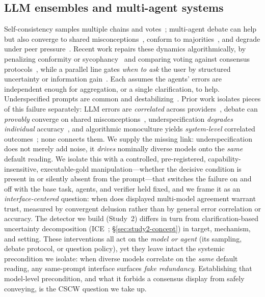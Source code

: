 \documentclass[acmsmall,screen,review,anonymous]{acmart}
\begin{document}
\subsection{LLM ensembles and multi-agent systems}
Self-consistency samples multiple chains and votes~\cite{wang2023selfconsistency}; multi-agent debate can
help~\cite{du2023debate,liang2024} but also converge to shared misconceptions~\cite{estornell2024}, conform
to majorities~\cite{choi2025conformity}, and degrade under peer pressure~\cite{wynn2025talk}. Recent work
repairs these dynamics algorithmically, by penalizing conformity or sycophancy~\cite{cui2025freemad,pitre2025consensagent}
and comparing voting against consensus protocols~\cite{kaesberg2025voting}, while a parallel line gates
\emph{when to ask} the user by structured uncertainty or information gain~\cite{suri2025structured,deng2026infogain,zhang2024clamber}.
Each assumes the agents' errors are independent enough for aggregation, or a single clarification, to help.
Underspecified prompts are common and destabilizing~\cite{yang2025underspecification}. Prior work isolates pieces of this failure separately: LLM errors are \emph{correlated} across
providers~\cite{kim2025correlated}, debate can \emph{provably} converge on shared
misconceptions~\cite{estornell2024}, underspecification \emph{degrades individual}
accuracy~\cite{yang2025underspecification}, and algorithmic monoculture yields \emph{system-level} correlated
outcomes~\cite{kleinberg2021monoculture}; none connects them. We supply the missing link: underspecification
does not merely add noise, it \emph{drives} nominally diverse models onto the \emph{same} default reading. We
isolate this with a controlled, pre-registered, capability-insensitive, executable-gold manipulation---whether
the decisive condition is present in or silently absent from the prompt---that switches the failure on and off
with the base task, agents, and verifier held fixed, and we frame it as an \emph{interface-centered} question:
when does displayed multi-model agreement warrant trust, measured by convergent delusion rather than by
general error correlation or accuracy. The detector we build (Study~2) differs in turn from clarification-based uncertainty
decomposition (ICE~\cite{hou2024decomposing}; \S\ref{sec:study2-concept}) in target, mechanism, and setting.
These interventions all act on the \emph{model or agent} (its sampling, debate protocol, or question policy),
yet they leave intact the systemic precondition we isolate: when diverse models correlate on the \emph{same}
default reading, any same-prompt interface surfaces \emph{fake redundancy}. Establishing that model-level
precondition, and what it forbids a consensus display from safely conveying, is the CSCW question we take up.
\end{document}
